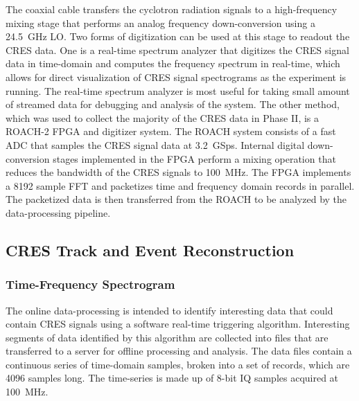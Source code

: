 The coaxial cable transfers the cyclotron radiation signals to a high-frequency mixing stage that performs an analog frequency down-conversion using a 24.5~GHz LO. Two forms of digitization can be used at this stage to readout the CRES data. One is a real-time spectrum analyzer that digitizes the CRES signal data in time-domain and computes the frequency spectrum in real-time, which allows for direct visualization of CRES signal spectrograms as the experiment is running. The real-time spectrum analyzer is most useful for taking small amount of streamed data for debugging and analysis of the system. The other method, which was used to collect the majority of the CRES data in Phase II, is a ROACH-2 FPGA and digitizer system. The ROACH system consists of a fast ADC that samples the CRES signal data at 3.2~GSps. Internal digital down-conversion stages implemented in the FPGA perform a mixing operation that reduces the bandwidth of the CRES signals to 100~MHz. The FPGA implements a 8192 sample FFT and packetizes time and frequency domain records in parallel. The packetized data is then transferred from the ROACH to be analyzed by the data-processing pipeline.

\subsection{CRES Track and Event Reconstruction}

\subsubsection*{Time-Frequency Spectrogram}

The online data-processing is intended to identify interesting data that could contain CRES signals using a software real-time triggering algorithm. Interesting segments of data identified by this algorithm are collected into files that are transferred to a server for offline processing and analysis. The data files contain a continuous series of time-domain samples, broken into a set of records, which are 4096 samples long. The time-series is made up of 8-bit IQ samples acquired at 100~MHz. 

